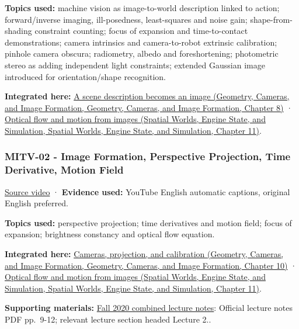 \textbf{Topics used:} machine vision as image-to-world description linked to action; forward/inverse imaging, ill-posedness, least-squares and noise gain; shape-from-shading constraint counting; focus of expansion and time-to-contact demonstrations; camera intrinsics and camera-to-robot extrinsic calibration; pinhole camera obscura; radiometry, albedo and foreshortening; photometric stereo as adding independent light constraints; extended Gaussian image introduced for orientation/shape recognition.

\textbf{Integrated here:} \href{../03-Geometry-Cameras-and-Image-Formation/main.pdf\#nameddest=03-visual-computing-i-ch001-a-scene-description-becomes-an-image}{A scene description becomes an image (Geometry, Cameras, and Image Formation, Geometry, Cameras, and Image Formation, Chapter 8)} · \href{../05-Spatial-Worlds-Engine-State-and-Simulation/main.pdf\#nameddest=04-visual-computing-ii-ch030-optical-flow-and-motion-from-images}{Optical flow and motion from images (Spatial Worlds, Engine State, and Simulation, Spatial Worlds, Engine State, and Simulation, Chapter 11)}.

\subsubsection{MITV-02 - Image Formation, Perspective Projection, Time Derivative, Motion Field}\label{04-visual-computing-ii-ch036-mitv-02---image-formation-perspective-projection-time-derivative-motion-field}

\href{https://www.youtube.com/watch?v=uM5AoUgCA00}{Source video} · \textbf{Evidence used:} YouTube English automatic captions, original English preferred.

\textbf{Topics used:} perspective projection; time derivatives and motion field; focus of expansion; brightness constancy and optical flow equation.

\textbf{Integrated here:} \href{../03-Geometry-Cameras-and-Image-Formation/main.pdf\#nameddest=03-visual-computing-i-ch003-cameras-projection-and-calibration}{Cameras, projection, and calibration (Geometry, Cameras, and Image Formation, Geometry, Cameras, and Image Formation, Chapter 10)} · \href{../05-Spatial-Worlds-Engine-State-and-Simulation/main.pdf\#nameddest=04-visual-computing-ii-ch030-optical-flow-and-motion-from-images}{Optical flow and motion from images (Spatial Worlds, Engine State, and Simulation, Spatial Worlds, Engine State, and Simulation, Chapter 11)}.

\textbf{Supporting materials:} \href{https://ocw.mit.edu/courses/6-801-machine-vision-fall-2020/9ec44f69e72995c370b3797818ba01e6_MIT6_801F20_lectureNotes.pdf}{Fall 2020 combined lecture notes}: Official lecture notes PDF pp.~9-12; relevant lecture section headed Lecture 2..

